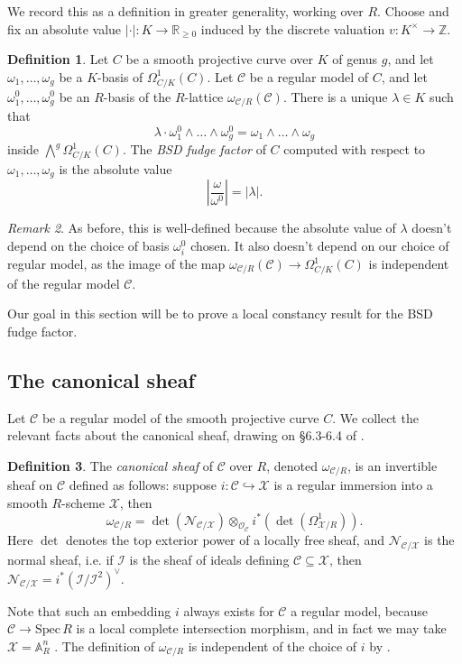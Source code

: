 \documentclass{article}
\theoremstyle{definition}
\newtheorem{defn}{Definition}[section]
\theoremstyle{plain}
\theoremstyle{remark}
\newtheorem{remark}[defn]{Remark}
\newcommand{\spec}{\mathrm{Spec}\,}
\begin{document}
	We record this as a definition in greater generality, working over $R$. Choose and fix an absolute value $|\cdot|:K \to \mathbb{R}_{\ge 0}$ induced by the discrete valuation $v: K^\times \to \mathbb{Z}$.
	\begin{defn}\label{defn_fudge_factor}
		Let $C$ be a smooth projective curve over $K$ of genus $g$, and let $\omega_1, \ldots, \omega_g$ be a $K$-basis of $\Omega^1_{C/K}(C)$. Let $\mathcal{C}$ be a regular model of $C$, and let $\omega^0_1, \ldots, \omega^0_g$ be an $R$-basis of the $R$-lattice $\omega_{\mathcal{C}/R}(\mathcal{C})$. There is a unique $\lambda\in K$ such that 
		\[\lambda\cdot \omega^0_1\wedge \ldots \wedge \omega^0_g = \omega_1\wedge \ldots \wedge \omega_g\]
		inside $\bigwedge^g\Omega^1_{C/K}(C)$. The \emph{BSD fudge factor} of $C$ computed with respect to $\omega_1, \ldots, \omega_g$ is the absolute value
		\[\left|\frac{\omega}{\omega^0}\right| = |\lambda|.\]
	\end{defn}
	\begin{remark}
		As before, this is well-defined because the absolute value of $\lambda$ doesn't depend on the choice of basis $\omega^0_i$ chosen. It also doesn't depend on our choice of regular model, as the image of the map $\omega_{\mathcal{C}/R}(\mathcal{C})\to \Omega^1_{C/K}(C)$ is independent of the regular model $\mathcal{C}$.
	\end{remark}
	Our goal in this section will be to prove a local constancy result for the BSD fudge factor.
	\subsection{The canonical sheaf}
	Let $\mathcal{C}$ be a regular model of the smooth projective curve $C$. We collect the relevant facts about the canonical sheaf, drawing on §6.3-6.4 of \cite{liu2002algebraic}.
	\begin{defn}
		The \emph{canonical sheaf} of $\mathcal{C}$ over $R$, denoted $\omega_{\mathcal{C}/R}$, is an invertible sheaf on $\mathcal{C}$ defined as follows: suppose $i: \mathcal{C}\hookrightarrow\mathcal{X}$ is a regular immersion into a smooth $R$-scheme $\mathcal{X}$, then
		\[\omega_{\mathcal{C}/R} = \det(\mathcal{N}_{\mathcal{C}/\mathcal{X}}) \otimes_{\mathcal{O}_\mathcal{C}} i^*(\det (\Omega^1_{\mathcal{X}/R})).\]
		Here $\det$ denotes the top exterior power of a locally free sheaf, and $\mathcal{N}_{\mathcal{C}/\mathcal{X}}$ is the normal sheaf, i.e. if $\mathcal{I}$ is the sheaf of ideals defining $\mathcal{C}\subseteq \mathcal{X}$, then $\mathcal{N}_{\mathcal{C}/\mathcal{X}} = i^*(\mathcal{I}/\mathcal{I}^2)^\vee$.
	\end{defn}
	Note that such an embedding $i$ always exists for $\mathcal{C}$ a regular model, because $\mathcal{C}\to \spec R$ is a local complete intersection morphism, and in fact we may take $\mathcal{X} = \mathbb{A}^n_R$ \cite[Example 6.3.18]{liu2002algebraic}. The definition of $\omega_{\mathcal{C}/R}$ is independent of the choice of $i$ by \cite[Lemma 6.4.5]{liu2002algebraic}.
	
\end{document}
